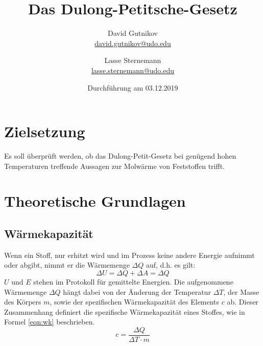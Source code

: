 \documentclass[titlepage = firstcover]{scrartcl}
\title{Das Dulong-Petitsche-Gesetz}
\author{
  David Gutnikov\\
  \href{mailto:david.gutnikov@udo.edu}{david.gutnikov@udo.edu}
 \and 
  Lasse Sternemann\\
  \href{mailto:lasse.sternemann@udo.edu}{lasse.sternemann@udo.edu}
}
\date{Durchführung am 03.12.2019}
\begin{document}
    \maketitle
    \newpage
    \tableofcontents
    \newpage

    \section{Zielsetzung}
        Es soll überprüft werden, ob das Dulong-Petit-Gesetz bei genügend hohen Temperaturen treffende Aussagen zur Molwärme von Feststoffen trifft.



    \section{Theoretische Grundlagen}
        \subsection{Wärmekapazität}
            Wenn ein Stoff, nur erhitzt wird und im Prozess keine andere Energie aufnimmt oder abgibt, nimmt er die
            Wärmemenge $\Delta Q$ auf, d.h. es gilt:
            \begin{equation*}
                \Delta U = \Delta Q + \Delta A = \Delta Q
            \end{equation*}
            $U$ und $E$ stehen im Protokoll für gemittelte Energien.
            Die aufgenommene Wärmemenge $\Delta Q$ hängt dabei von der Änderung der Temperatur $\Delta T$,
            der Masse des Körpers $m$, sowie der spezifischen Wärmekapazität des Elements $c$ ab. Dieser Zusammenhang
            definiert die spezifische Wärmekapazität eines Stoffes, wie in Formel \eqref{eqn:wk} beschrieben.  
            \begin{equation}
                c = \frac{\Delta Q}{\Delta T \cdot m }
                \label{eqn:wk}
            \end{equation}
        
\end{document}

